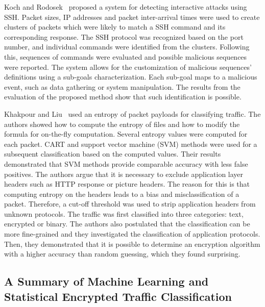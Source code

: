 Koch and Rodosek~\cite{Koch-2010-Command} proposed a system for detecting interactive attacks using SSH. Packet sizes, IP addresses and packet inter-arrival times were used to create clusters of packets which were likely to match a SSH command and its corresponding response. The SSH protocol was recognized based on the port number, and individual commands were identified from the clusters. Following this, sequences of commands were evaluated and possible malicious sequences were reported. The system allows for the customization of malicious sequences' definitions using a sub-goals characterization. Each sub-goal maps to a malicious event, such as data gathering or system manipulation. The results from the evaluation of the proposed method show that such identification is possible. 

Khakpour and Liu~\cite{Khakpour-2013-Information} used an entropy of packet payloads for classifying traffic. The authors showed how to compute the entropy of files and how to modify the formula for on-the-fly computation. Several entropy values were computed for each packet. CART and support vector machine (SVM) methods were used for a subsequent classification based on the computed values. Their results demonstrated that SVM methods provide comparable accuracy with less false positives. The authors argue that it is necessary to exclude application layer headers such as HTTP response or picture headers. The reason for this is that computing entropy on the headers leads to a bias and misclassification of a packet. Therefore, a cut-off threshold was used to strip application headers from unknown protocols. The traffic was first classified into three categories: text, encrypted or binary. The authors also postulated that the classification can be more fine-grained and they investigated the classification of application protocols. Then, they demonstrated that it is possible to determine an encryption algorithm with a higher accuracy than random guessing, which they found surprising.

\subsection{A Summary of Machine Learning and Statistical Encrypted Traffic Classification}\label{subsec:methods-summary}

